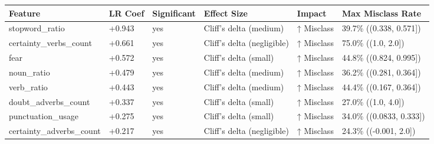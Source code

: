 \begin{tabular}{llllll}
\toprule
Feature & LR Coef & Significant & Effect Size & Impact & Max Misclass Rate \\
\midrule
stopword\_ratio & +0.943 & yes & Cliff's delta (medium) & ↑ Misclass & 39.7\% ((0.338, 0.571]) \\
certainty\_verbs\_count & +0.661 & yes & Cliff's delta (negligible) & ↑ Misclass & 75.0\% ((1.0, 2.0]) \\
fear & +0.572 & yes & Cliff's delta (small) & ↑ Misclass & 44.8\% ((0.824, 0.995]) \\
noun\_ratio & +0.479 & yes & Cliff's delta (medium) & ↑ Misclass & 36.2\% ((0.281, 0.364]) \\
verb\_ratio & +0.443 & yes & Cliff's delta (medium) & ↑ Misclass & 44.4\% ((0.167, 0.364]) \\
doubt\_adverbs\_count & +0.337 & yes & Cliff's delta (small) & ↑ Misclass & 27.0\% ((1.0, 4.0]) \\
punctuation\_usage & +0.275 & yes & Cliff's delta (small) & ↑ Misclass & 34.0\% ((0.0833, 0.333]) \\
certainty\_adverbs\_count & +0.217 & yes & Cliff's delta (negligible) & ↑ Misclass & 24.3\% ((-0.001, 2.0]) \\
\bottomrule
\end{tabular}
